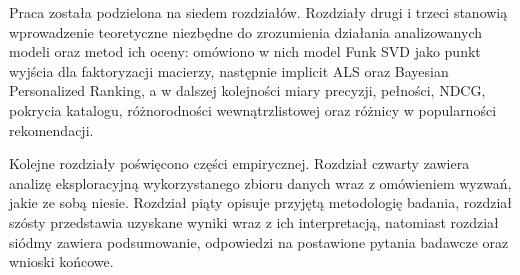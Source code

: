 Praca została podzielona na siedem rozdziałów. Rozdziały drugi i trzeci stanowią wprowadzenie teoretyczne niezbędne do zrozumienia działania analizowanych modeli oraz metod ich oceny: omówiono w nich model Funk SVD jako punkt wyjścia dla faktoryzacji macierzy, następnie implicit ALS oraz Bayesian Personalized Ranking, a w dalszej kolejności miary precyzji, pełności, NDCG, pokrycia katalogu, różnorodności wewnątrzlistowej oraz różnicy w popularności rekomendacji.

Kolejne rozdziały poświęcono części empirycznej. Rozdział czwarty zawiera analizę eksploracyjną wykorzystanego zbioru danych wraz z omówieniem wyzwań, jakie ze sobą niesie. Rozdział piąty opisuje przyjętą metodologię badania, rozdział szósty przedstawia uzyskane wyniki wraz z ich interpretacją, natomiast rozdział siódmy zawiera podsumowanie, odpowiedzi na postawione pytania badawcze oraz wnioski końcowe.